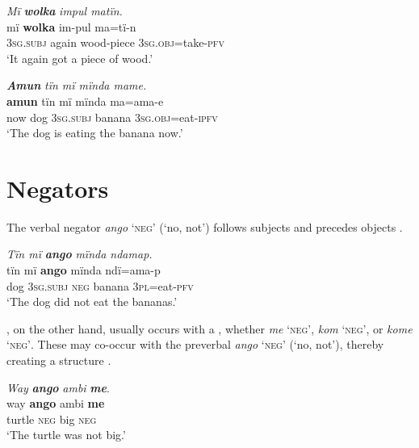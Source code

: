 
\ea%
    \label{ex:overview:47}
    \textit{Mï} \textbf{\textit{wolka}} {\textit{impul matïn.}}\\
\gll    mï      \textbf{wolka}  {im-pul}      {ma=tï-n}\\
    3\textsc{sg.subj}  again  wood-piece  3\textsc{sg.obj}=take-\textsc{pfv}\\
\glt    ‘It again got a piece of wood.’
\z

\ea%
    \label{ex:overview:48}
    \textbf{\textit{Amun}} \textit{tïn mï mïnda mame.}\\
\gll    \textbf{amun}  tïn    mï      mïnda    ma=ama-e\\
    now  dog  3\textsc{sg.subj}  banana    3\textsc{sg.obj=}eat-\textsc{ipfv}\\
\glt    ‘The dog is eating the banana now.’
\z

\newpage

\section{Negators}\label{sec:overview:2.10}


The  verbal negator \textit{ango} ‘\textsc{neg’} (‘no, not’) follows subjects and precedes objects .

\ea%
    \label{ex:overview:49}
    \textit{Tïn mï} \textbf{\textit{ango}} \textit{mïnda ndamap.}\\
\gll    tïn    mï      \textbf{ango}  mïnda    ndï=ama-p\\
    dog  3\textsc{sg.subj}  \textsc{neg}  banana    3\textsc{pl=}eat-\textsc{pfv}\\
\glt    ‘The dog did not eat the bananas.’
\z

, on the other hand, usually occurs with a , whether \textit{me} ‘\textsc{neg’}, \textit{kom} ‘\textsc{neg}’, or \textit{kome} ‘\textsc{neg’}. These may co-occur with the preverbal  \textit{ango} ‘\textsc{neg}’ (‘no, not’), thereby creating a  structure .

\ea%
    \label{ex:overview:50}
    \textit{Way} \textbf{\textit{ango}} \textit{ambi} \textbf{\textit{me}}.\\
\gll    way  \textbf{ango}  ambi  \textbf{me}\\
    turtle  \textsc{neg}  big    \textsc{neg}\\
\glt    ‘The turtle was not big.’
\z


